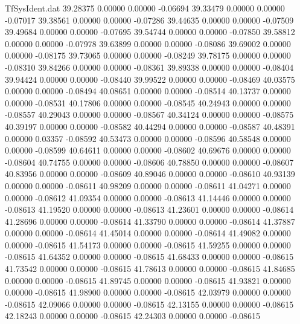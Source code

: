 \begin{filecontents}{TfSysIdent.dat}
  39.28375    0.00000    0.00000   -0.06694
  39.33479    0.00000    0.00000   -0.07017
  39.38561    0.00000    0.00000   -0.07286
  39.44635    0.00000    0.00000   -0.07509
  39.49684    0.00000    0.00000   -0.07695
  39.54744    0.00000    0.00000   -0.07850
  39.58812    0.00000    0.00000   -0.07978
  39.63899    0.00000    0.00000   -0.08086
  39.69002    0.00000    0.00000   -0.08175
  39.73065    0.00000    0.00000   -0.08249
  39.78175    0.00000    0.00000   -0.08310
  39.84266    0.00000    0.00000   -0.08361
  39.89338    0.00000    0.00000   -0.08404
  39.94424    0.00000    0.00000   -0.08440
  39.99522    0.00000    0.00000   -0.08469
  40.03575    0.00000    0.00000   -0.08494
  40.08651    0.00000    0.00000   -0.08514
  40.13737    0.00000    0.00000   -0.08531
  40.17806    0.00000    0.00000   -0.08545
  40.24943    0.00000    0.00000   -0.08557
  40.29043    0.00000    0.00000   -0.08567
  40.34124    0.00000    0.00000   -0.08575
  40.39197    0.00000    0.00000   -0.08582
  40.44294    0.00000    0.00000   -0.08587
  40.48391    0.00000    0.03357   -0.08592
  40.53473    0.00000    0.00000   -0.08596
  40.58548    0.00000    0.00000   -0.08599
  40.64611    0.00000    0.00000   -0.08602
  40.69676    0.00000    0.00000   -0.08604
  40.74755    0.00000    0.00000   -0.08606
  40.78850    0.00000    0.00000   -0.08607
  40.83956    0.00000    0.00000   -0.08609
  40.89046    0.00000    0.00000   -0.08610
  40.93139    0.00000    0.00000   -0.08611
  40.98209    0.00000    0.00000   -0.08611
  41.04271    0.00000    0.00000   -0.08612
  41.09354    0.00000    0.00000   -0.08613
  41.14446    0.00000    0.00000   -0.08613
  41.19520    0.00000    0.00000   -0.08613
  41.23601    0.00000    0.00000   -0.08614
  41.28696    0.00000    0.00000   -0.08614
  41.33790    0.00000    0.00000   -0.08614
  41.37887    0.00000    0.00000   -0.08614
  41.45014    0.00000    0.00000   -0.08614
  41.49082    0.00000    0.00000   -0.08615
  41.54173    0.00000    0.00000   -0.08615
  41.59255    0.00000    0.00000   -0.08615
  41.64352    0.00000    0.00000   -0.08615
  41.68433    0.00000    0.00000   -0.08615
  41.73542    0.00000    0.00000   -0.08615
  41.78613    0.00000    0.00000   -0.08615
  41.84685    0.00000    0.00000   -0.08615
  41.89745    0.00000    0.00000   -0.08615
  41.93821    0.00000    0.00000   -0.08615
  41.98900    0.00000    0.00000   -0.08615
  42.03979    0.00000    0.00000   -0.08615
  42.09066    0.00000    0.00000   -0.08615
  42.13155    0.00000    0.00000   -0.08615
  42.18243    0.00000    0.00000   -0.08615
  42.24303    0.00000    0.00000   -0.08615

\end{filecontents}
